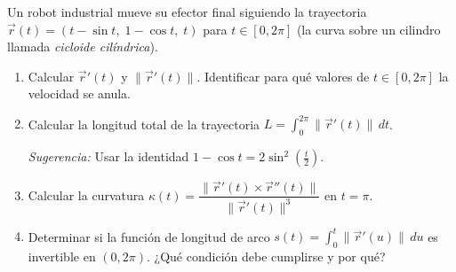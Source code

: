 Un robot industrial mueve su efector final siguiendo la trayectoria $\vec{r}(t) = (t - \sin t,\; 1 - \cos t,\; t)$ para $t \in [0, 2\pi]$ (la curva sobre un cilindro llamada \textit{cicloide cilíndrica}).
\begin{enumerate}
    \item Calcular $\vec{r}'(t)$ y $\|\vec{r}'(t)\|$. Identificar para qué valores de $t \in [0, 2\pi]$ la velocidad se anula.
    \item Calcular la longitud total de la trayectoria $L = \displaystyle\int_0^{2\pi} \|\vec{r}'(t)\|\, dt$.

    \textit{Sugerencia:} Usar la identidad $1 - \cos t = 2\sin^2\!\left(\frac{t}{2}\right)$.
    \item Calcular la curvatura $\kappa(t) = \dfrac{\|\vec{r}'(t)\times\vec{r}''(t)\|}{\|\vec{r}'(t)\|^3}$ en $t = \pi$.
    \item Determinar si la función de longitud de arco $s(t) = \displaystyle\int_0^t \|\vec{r}'(u)\|\,du$ es invertible en $(0, 2\pi)$. ¿Qué condición debe cumplirse y por qué?
\end{enumerate}